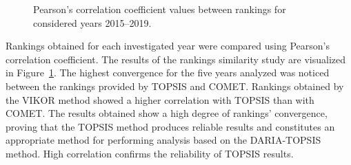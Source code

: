 \documentclass[5p,times]{elsarticle}
\begin{document}
\begin{figure}[ht!]
\centering
\quad
{}
\quad
{}
\caption{Pearson's correlation coefficient values between rankings for considered years 2015--2019.}
\label{fig:correlations}
\end{figure}
%
Rankings obtained for each investigated year were compared using Pearson's correlation coefficient. The results of the rankings similarity study are visualized in Figure~\ref{fig:correlations}. The highest convergence for the five years analyzed was noticed between the rankings provided by TOPSIS and COMET. Rankings obtained by the VIKOR method showed a higher correlation with TOPSIS than with COMET. The results obtained show a high degree of rankings' convergence, proving that the TOPSIS method produces reliable results and constitutes an appropriate method for performing analysis based on the DARIA-TOPSIS method. High correlation confirms the reliability of TOPSIS results.
\end{document}

